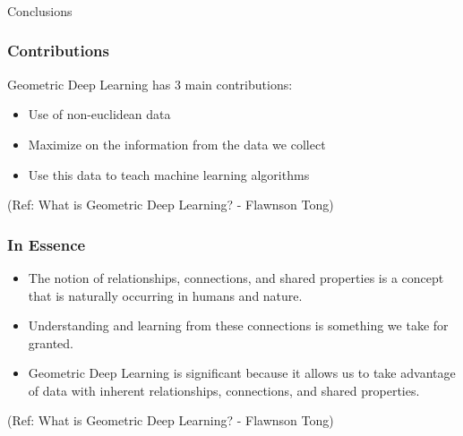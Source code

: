 \begin{frame}[fragile]\frametitle{}
\begin{center}
{\Large Conclusions}
\end{center}
\end{frame}

\begin{frame}[fragile]\frametitle{Contributions}

Geometric Deep Learning has 3 main contributions:

\begin{itemize}
\item Use of non-euclidean data
\item Maximize on the information from the data we collect
\item Use this data to teach machine learning algorithms
\end{itemize}
	  
{\tiny (Ref: What is Geometric Deep Learning? - Flawnson Tong)}

\end{frame}

\begin{frame}[fragile]\frametitle{In Essence}


\begin{itemize}
\item The notion of relationships, connections, and shared properties is a concept that is naturally occurring in humans and nature. 
\item Understanding and learning from these connections is something we take for granted. 
\item Geometric Deep Learning is significant because it allows us to take advantage of data with inherent relationships, connections, and shared properties.
\end{itemize}
	  
{\tiny (Ref: What is Geometric Deep Learning? - Flawnson Tong)}

\end{frame}


